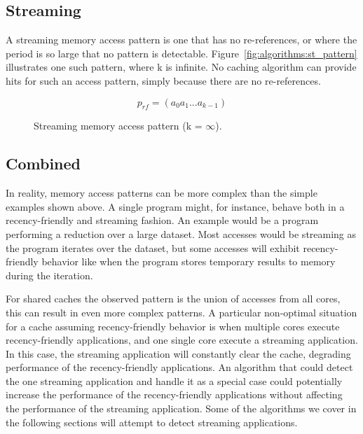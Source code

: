 \subsection{Streaming}
A streaming memory access pattern is one that has no re-references, or where the period is so large that no pattern is detectable.
Figure~\ref{fig:algorithms:st_pattern} illustrates one such pattern, where k is infinite.
No caching algorithm can provide hits for such an access pattern, simply because there are no re-references.

\begin{figure}[ht]
\centering
\begin{equation} \label{fig:algorithms:st_pattern}
p_{rf} = (a_0 a_1 ... a_{k-1})
\end{equation}
\caption{Streaming memory access  pattern (k = $\infty$).}
\end{figure}

\subsection{Combined}
In reality, memory access patterns can be more complex than the simple examples shown above.
A single program might, for instance, behave both in a recency-friendly and streaming fashion. 
An example would be a program performing a reduction over a large dataset.
Most accesses would be streaming as the program iterates over the dataset, but some accesses will exhibit recency-friendly behavior like when the program stores temporary results to memory during the iteration.

For shared caches the observed pattern is the union of accesses from all cores, this can result in even more complex patterns.
A particular non-optimal situation for a cache assuming recency-friendly behavior is when multiple cores execute recency-friendly applications, and one single core execute a streaming application.
In this case, the streaming application will constantly clear the cache, degrading performance of the recency-friendly applications.
An algorithm that could detect the one streaming application and handle it as a special case could potentially increase the performance of the recency-friendly applications without affecting the performance of the streaming application.
Some of the algorithms we cover in the following sections will attempt to detect streaming applications.